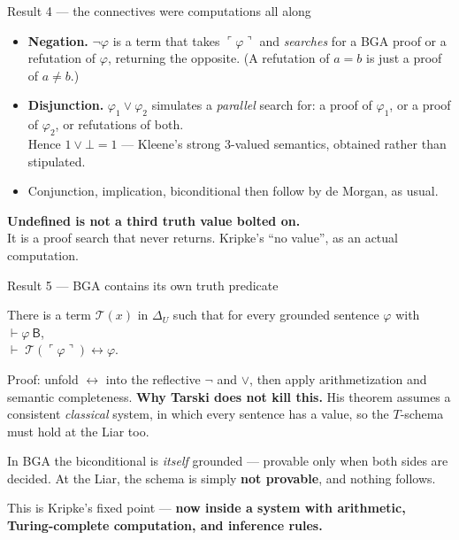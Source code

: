 \documentclass[aspectratio=169,11pt]{beamer}
\newcommand{\key}[1]{{\color{accent}\textbf{#1}}}
\begin{document}
\begin{frame}{Result 4 --- the connectives were computations all along}
  \vfill
  \small
  \begin{itemize}\itemsep0.5em
    \item \key{Negation.} $\neg\varphi$ is a term that takes $\ulcorner\varphi\urcorner$
          and \emph{searches} for a BGA proof or a refutation of $\varphi$, returning
          the opposite. {\footnotesize (A refutation of $a=b$ is just a proof of $a \neq b$.)}
    \item \key{Disjunction.} $\varphi_1 \vee \varphi_2$ simulates a \emph{parallel}
          search for: a proof of $\varphi_1$, or a proof of $\varphi_2$, or refutations
          of both. \\{\footnotesize Hence $1 \vee \bot = 1$ --- Kleene's strong 3-valued
          semantics, obtained rather than stipulated.}
    \item Conjunction, implication, biconditional then follow by de Morgan, as usual.
  \end{itemize}
  \vfill
  \pause
  \begin{center}
    \key{Undefined is not a third truth value bolted on.}\\[0.2em]
    {\small It is a proof search that never returns. Kripke's ``no value'', as an
     actual computation.}
  \end{center}
\end{frame}

\begin{frame}{Result 5 --- BGA contains its own truth predicate}
  \vfill
  \begin{center}\large
    There is a term $\mathcal{T}(x)$ in $\Delta_U$ such that for every grounded
    sentence $\varphi$ with $\vdash \varphi\ \mathsf{B}$,\\[0.4em]
    $\vdash\; \mathcal{T}(\ulcorner\varphi\urcorner) \leftrightarrow \varphi.$
  \end{center}
  \vfill
  {\small Proof: unfold $\leftrightarrow$ into the reflective $\neg$ and $\vee$, then apply
   arithmetization and semantic completeness.}
  \vfill
  \pause
  \key{Why Tarski does not kill this.} His theorem assumes a consistent
  \emph{classical} system, in which every sentence has a value, so the $T$-schema
  must hold at the Liar too.
  \vfill
  \begin{center}\small
    In BGA the biconditional is \emph{itself} grounded --- provable only when both
    sides are decided. At the Liar, the schema is simply \key{not provable}, and
    nothing follows.
  \end{center}
  \vfill
  \pause
  \begin{center}
    This is Kripke's fixed point --- \key{now inside a system with arithmetic,
    Turing-complete computation, and inference rules.}
  \end{center}
  \vfill
\end{frame}
\end{document}
